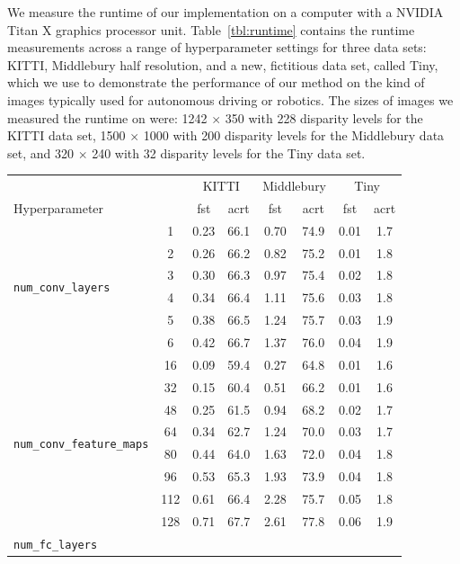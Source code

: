 \documentclass[twoside,11pt]{article}
\begin{document}
We measure the runtime of our implementation on a computer with a NVIDIA Titan
X graphics processor unit. Table~\ref{tbl:runtime} contains the runtime
measurements across a range of hyperparameter settings for three data sets:
KITTI, Middlebury half resolution, and a new, fictitious data set, called
Tiny, which we use to demonstrate the performance of our method on the kind of
images typically used for autonomous driving or robotics. The sizes
of images we measured the runtime on were: 1242 \(\times\) 350 with 228
disparity levels for the KITTI data set, 1500 \(\times\) 1000 with 200 disparity
levels for the Middlebury data set, and 320 \(\times\) 240 with 32 disparity
levels for the Tiny data set. 

\begin{table}[p]
\begin{center}
\begin{tabular}{lc cc cc cc}
\toprule
& & \multicolumn{2}{c}{KITTI} &
\multicolumn{2}{c}{Middlebury} &
\multicolumn{2}{c}{Tiny} \\
\cmidrule(lr){3-4}
\cmidrule(lr){5-6}
\cmidrule(lr){7-8}
Hyperparameter & & fst & acrt & fst & acrt & fst & acrt \\\midrule
\multirow{6}{*}{\texttt{num\_conv\_layers}}
& 1 & 0.23 & 66.1 & 0.70 & 74.9 & 0.01 & 1.7 \\
& 2 & 0.26 & 66.2 & 0.82 & 75.2 & 0.01 & 1.8 \\
& 3 & 0.30 & 66.3 & 0.97 & 75.4 & 0.02 & 1.8 \\
& 4 & 0.34 & 66.4 & 1.11 & 75.6 & 0.03 & 1.8 \\
& 5 & 0.38 & 66.5 & 1.24 & 75.7 & 0.03 & 1.9 \\
& 6 & 0.42 & 66.7 & 1.37 & 76.0 & 0.04 & 1.9 \\\midrule
\multirow{8}{*}{\texttt{num\_conv\_feature\_maps}}
& 16 & 0.09 & 59.4 & 0.27 & 64.8 & 0.01 & 1.6 \\
& 32 & 0.15 & 60.4 & 0.51 & 66.2 & 0.01 & 1.6 \\
& 48 & 0.25 & 61.5 & 0.94 & 68.2 & 0.02 & 1.7 \\
& 64 & 0.34 & 62.7 & 1.24 & 70.0 & 0.03 & 1.7 \\
& 80 & 0.44 & 64.0 & 1.63 & 72.0 & 0.04 & 1.8 \\
& 96 & 0.53 & 65.3 & 1.93 & 73.9 & 0.04 & 1.8 \\
& 112 & 0.61 & 66.4 & 2.28 & 75.7 & 0.05 & 1.8 \\
& 128 & 0.71 & 67.7 & 2.61 & 77.8 & 0.06 & 1.9 \\\midrule
\multirow{5}{*}{\texttt{num\_fc\_layers}}

\end{tabular}
\end{center}
\end{table}
\end{document}
